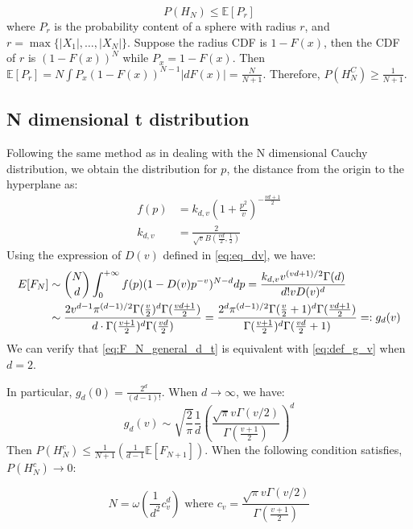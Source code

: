 \documentclass{article}
\def\E{\mathbb{E}}
\begin{document}
\begin{equation}
    P(H_N) \leq \E[P_r]
\end{equation}
where $P_r$ is the probability content of a sphere with radius $r$,
and $r= \max\{|X_1|, \dots, |X_N|\}$. Suppose the radius CDF is $1-F(x)$,
then the CDF of $r$ is $(1-F(x))^N$ while $P_x=1-F(x)$.
Then  $\E[P_r] =N\int P_x(1-F(x))^{N-1} |dF(x)|=\frac{N}{N+1}$.
Therefore, $P(H_N^C)\geq \frac{1}{N+1}$.

\subsection{N dimensional t distribution}
Following the same method as in dealing with the N dimensional Cauchy distribution,
we obtain the distribution for $p$, the distance from the origin to the hyperplane as:
\begin{align}
    f(p) & = k_{d,v} \left(1 + \frac{p^2}{v} \right)^{-\frac{vd+1}{2}} \\
    k_{d,v} & = \frac{2}{\sqrt{v} B(\frac{vd}{2},\frac{1}{2})}
\end{align}
Using the expression of $D(v)$ defined in \eqref{eq:eq_dv},
we have:
\begin{align}\notag
    E[F_N] & \sim \binom{N}{d}\int_0^{+\infty} f(p)
    (1-D(v)p^{-v})^{N-d} dp
    = \frac{k_{d,v} v^{(vd+1)/2}\Gamma(d)}{d! v D(v)^d} \\
    & \sim \frac{2 v^{d-1} \pi^{(d-1)/2}
    \Gamma(\frac{v}{2})^{d} \Gamma(\frac{vd+1}{2})}
    {d \cdot \Gamma(\frac{v+1}{2})^d
    \Gamma(\frac{vd}{2})}
    = \frac{2^d \pi^{(d-1)/2}
    \Gamma(\frac{v}{2} +1)^{d} \Gamma(\frac{vd+1}{2})}
    { \Gamma(\frac{v+1}{2})^d
    \Gamma(\frac{vd}{2} + 1)} =:g_d(v)
    \label{eq:F_N_general_d_t}
\end{align}
We can verify that \eqref{eq:F_N_general_d_t} is equivalent with
\eqref{eq:def_g_v} when $d=2$.

In particular, $g_d(0) = \frac{2^d}{(d-1)!}$.
When $d\to \infty$, we have:
$$
g_d(v) \sim \sqrt{\frac{2}{\pi}}\frac{1}{d}\left(
    \frac{\sqrt{\pi}v \Gamma(v/2)}{\Gamma(\frac{v+1}{2})}
\right)^d
$$
Then $P(H_N^c) \leq \frac{1}{N+1}(\frac{1}{d-1} \E[F_{N+1}])$.
When the following condition satisfies, $P(H_N^c) \to 0$:

\begin{equation}
    N = \omega(\frac{1}{d^2} c_v^d) \textrm{ where }
    c_v = \frac{\sqrt{\pi}v \Gamma(v/2)}{\Gamma(\frac{v+1}{2})}
\end{equation}
\end{document}
